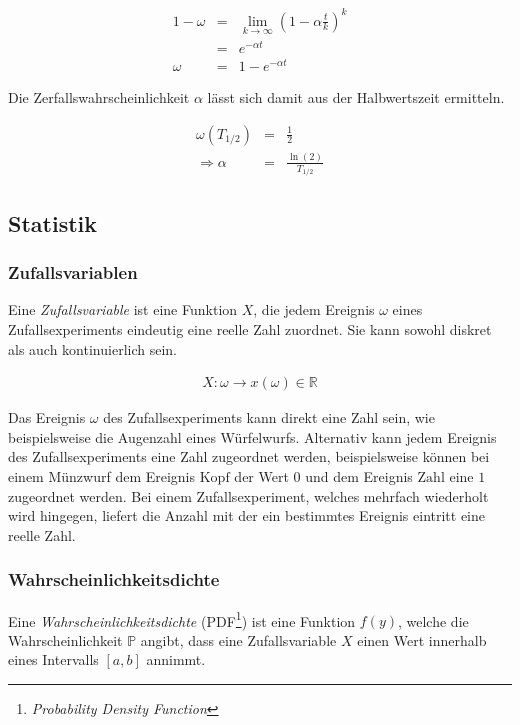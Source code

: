 \documentclass[12pt,a4paper]{scrartcl}
\numberwithin{equation}{section} %
\begin{document}
\begin{eqnarray}
	1 - \omega &=& \lim_{k \rightarrow \infty} \left(1 - \alpha \frac{t}{k} \right)^k \\
	&=& e^{- \alpha t} \\
	\omega &=& 1 - e^{-\alpha t}
\end{eqnarray}

\noindent
Die Zerfallswahrscheinlichkeit $\alpha$ lässt sich damit aus der Halbwertszeit ermitteln.

\begin{eqnarray}
	\omega(T_{1/2}) &=& \frac{1}{2} \\
	\Rightarrow\alpha &=& \frac{\ln{(2)}}{T_{1/2}}
\end{eqnarray}

\hypertarget{statistik}{\subsection{Statistik}\label{statistik}}

\subsubsection{Zufallsvariablen}
\label{Zufallsvariablen}
Eine \emph{Zufallsvariable} ist eine Funktion $X$, die jedem Ereignis $\omega$ eines Zufallsexperiments eindeutig eine reelle Zahl zuordnet. Sie kann sowohl diskret als auch kontinuierlich sein.

\begin{eqnarray}
	X : \omega \rightarrow x(\omega) \in \mathbb{R}
\end{eqnarray}

\noindent
Das Ereignis $\omega$ des Zufallsexperiments kann direkt eine Zahl sein, wie beispielsweise die Augenzahl eines Würfelwurfs. Alternativ kann jedem Ereignis des Zufallsexperiments eine Zahl zugeordnet werden, beispielsweise können bei einem Münzwurf dem Ereignis $\mathrm{Kopf}$ der Wert $0$ und dem Ereignis $\mathrm{Zahl}$ eine $1$ zugeordnet werden. Bei einem Zufallsexperiment, welches mehrfach wiederholt wird hingegen, liefert die Anzahl mit der ein bestimmtes Ereignis eintritt eine reelle Zahl.

\subsubsection{Wahrscheinlichkeitsdichte}
\label{Wahrscheinlichkeitsdichte}
Eine \textit{Wahrscheinlichkeitsdichte} (PDF\footnote{\emph{Probability Density Function}}) ist eine Funktion $f(y)$, welche die Wahrscheinlichkeit $\mathbb P$ angibt, dass eine Zufallsvariable $X$ einen Wert innerhalb eines Intervalls $[a,b]$ annimmt.
\end{document}
